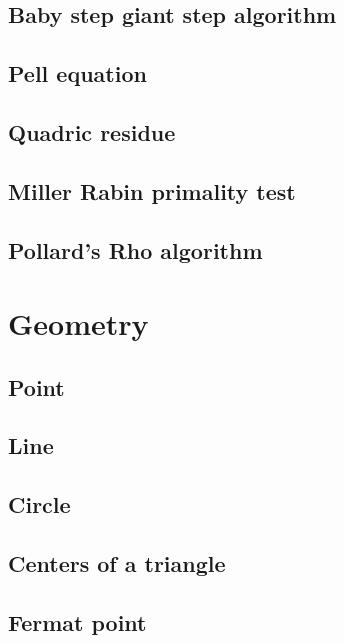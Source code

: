 \documentclass[titlepage, a4paper,10pt]{article}
\begin{document}
\begin{multicols}{2}
\begin{spacing}{0.6}
{			\subsection{Baby step giant step algorithm}
				
			\subsection{Pell equation}
				
			\subsection{Quadric residue}
				
			\subsection{Miller Rabin primality test}
				
			\subsection{Pollard's Rho algorithm}
				
		\section{Geometry}
				
			\subsection{Point}
				
			\subsection{Line}
				
			\subsection{Circle}
				
			\subsection{Centers of a triangle}
				
			\subsection{Fermat point}
				
}
\end{spacing}
\end{multicols}
\end{document}
